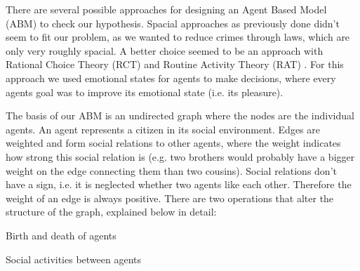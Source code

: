 \documentclass{JASSS}
\begin{document}
	There are several possible approaches for designing an Agent Based Model (ABM) to check our hypothesis.
    Spacial approaches as previously done \citep{burglary} didn't seem to fit our problem, as we wanted to reduce crimes through laws, which are only very roughly spacial.
	A better choice seemed to be an approach with Rational Choice Theory (RCT) \citep{rationalchoice} and Routine Activity Theory (RAT) \citep{routineactivity}.
    For this approach we used emotional states for agents to make decisions, where every agents goal was to improve its emotional state (i.e. its pleasure).

	The basis of our ABM is an undirected graph where the nodes are the individual agents.
	An agent represents a citizen in its social environment.
	Edges are weighted and form social relations to other agents, where the weight indicates how strong this social relation is (e.g. two brothers would probably have a bigger weight on the edge connecting them than two cousins).
	Social relations don't have a sign, i.e. it is neglected whether two agents like each other. Therefore the weight of an edge is always positive.
	There are two operations that alter the structure of the graph, explained below in detail:
	\begin{itemize*}
		\item Birth and death of agents
		\item Social activities between agents
	\end{itemize*}
\end{document}
